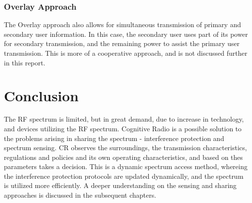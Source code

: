 \subsubsection{Overlay Approach}
The Overlay approach also allows for simultaneous transmission of primary and
secondary user information. In this case, the secondary user uses part of its
power for secondary transmission, and the remaining power to assist the primary
user transmission. This is more of a cooperative approach, and is not discussed
further in this report.

\section{Conclusion}
The RF spectrum is limited, but in great demand, due to increase in technology,
and devices utilizing the RF spectrum. Cognitive Radio is a possible solution to
the problems arising in sharing the spectrum - interference protection and
spectrum sensing. CR observes the surroundings, the transmission
characteristics, regulations and policies and its own operating characteristics,
and based on thes parameters takes a decision. This is a dynamic spectrum access
method, whereing the interference protection protocols are updated dynamically,
and the spectrum is utilized more efficiently. A deeper understanding on the
sensing and sharing approaches is discussed in the subsequent chapters.
